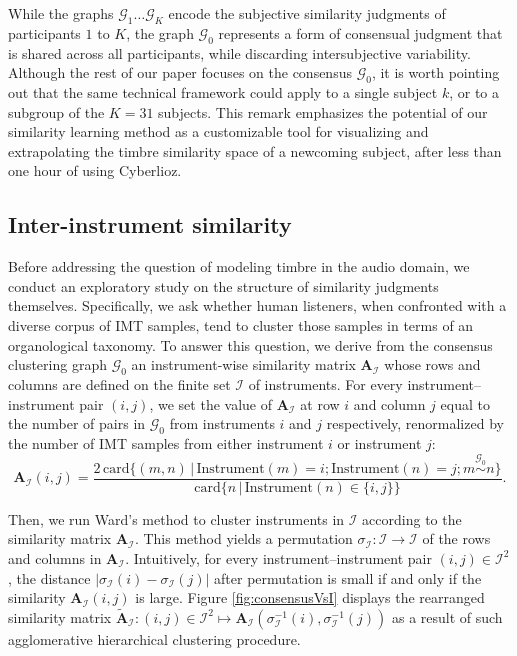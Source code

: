 \documentclass{bmcart}
\newcommand{\Card}{\mathrm{card}}
\begin{document}
While the graphs $\mathcal{G}_1 \ldots \mathcal{G}_K$ encode the subjective similarity judgments of participants $1$ to $K$, the graph $\mathcal{G}_0$ represents a form of consensual judgment that is shared across all participants, while discarding intersubjective variability.
Although the rest of our paper focuses on the consensus $\mathcal{G}_0$, it is worth pointing out that the same technical framework could apply to a single subject $k$, or to a subgroup of the $K=31$ subjects.
This remark emphasizes the potential of our similarity learning method as a customizable tool for visualizing and extrapolating the timbre similarity space of a newcoming subject, after less than one hour of using Cyberlioz.

\subsection*{Inter-instrument similarity}

Before addressing the question of modeling timbre in the audio domain, we conduct an exploratory study on the structure of similarity judgments themselves.
Specifically, we ask whether human listeners, when confronted with a diverse corpus of IMT samples, tend to cluster those samples in terms of an organological taxonomy.
To answer this question, we derive from the consensus clustering graph $\mathcal{G}_0$ an instrument-wise similarity matrix $\mathbf{A}_{\mathcal{I}}$ whose rows and columns are defined on the finite set $\mathcal{I}$ of instruments.
For every instrument--instrument pair $(i,j)$, we set the value of $\mathbf{A}_{\mathcal{I}}$ at row $i$ and column $j$ equal to the number of pairs in $\mathcal{G}_0$ from instruments $i$ and $j$ respectively, renormalized by the number of IMT samples from either instrument $i$ or instrument $j$:
\begin{equation}
\mathbf{A}_{\mathcal{I}}(i,j) = \dfrac{
2\,\Card \big\{ (m, n) \,\vert\, \mathrm{Instrument}(m)=i ; \mathrm{Instrument}(n)=j ; m \overset{\mathcal{G}_0}{\sim} n \big\}
}{
\Card \big\{n \,\vert\, \mathrm{Instrument}(n) \in \{ i, j \} \big\}
}.
\label{eq:instrument-similarity}
\end{equation}

Then, we run Ward's method to cluster instruments in $\mathcal{I}$ according to the similarity matrix $\mathbf{A}_{\mathcal{I}}$.
This method yields a permutation $\sigma_{\mathcal{I}}: \mathcal{I} \rightarrow \mathcal{I}$ of the rows and columns in $\mathbf{A}_{\mathcal{I}}$.
Intuitively, for every instrument--instrument pair $(i, j) \in \mathcal{I}^2$, the distance $\vert \sigma_{\mathcal{I}}(i) - \sigma_{\mathcal{I}}(j) \vert$ after permutation is small if and only if the similarity $\mathbf{A}_{\mathcal{I}}(i, j)$ is large.
Figure \ref{fig:consensusVsI} displays the rearranged similarity matrix $\widetilde{\mathbf{A}}_{\mathcal{I}} : (i,j)\in \mathcal{I}^2 \mapsto \mathbf{A}_{\mathcal{I}}(\sigma_{\mathcal{I}}^{-1}(i), \sigma_{\mathcal{I}}^{-1}(j))$ as a result of such agglomerative hierarchical clustering procedure.
\end{document}
